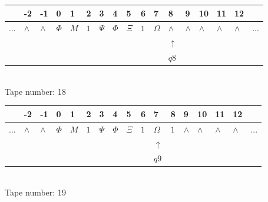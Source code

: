 \documentclass[11pt]{article}
\begin{document}
\begin{table}[H]
\centering
\begin{tabular}{lllllllllllllllll}
 & -2 & -1 & 0 & 1 & 2 & 3 & 4 & 5 & 6 & 7 & 8 & 9 & 10 & 11 & 12 & \\
\hline
$...$ & \multicolumn{1}{|l|}{$\wedge$} & \multicolumn{1}{|l|}{$\wedge$} & \multicolumn{1}{|l|}{$\Phi$} & \multicolumn{1}{|l|}{$M$} & \multicolumn{1}{|l|}{$1$} & \multicolumn{1}{|l|}{$\Psi$} & \multicolumn{1}{|l|}{$\Phi$} & \multicolumn{1}{|l|}{$\Xi$} & \multicolumn{1}{|l|}{$1$} & \multicolumn{1}{|l|}{$\Omega$} & \multicolumn{1}{|l|}{$\wedge$} & \multicolumn{1}{|l|}{$\wedge$} & \multicolumn{1}{|l|}{$\wedge$} & \multicolumn{1}{|l|}{$\wedge$} & \multicolumn{1}{|l|}{$\wedge$} & $...$\\
\hline
&  &  &  &  &  &  &  &  &  &  & $\uparrow$ &  &  &  &  &  \\
&  &  &  &  &  &  &  &  &  &  & $ q8 $ &  &  &  &  &  \\
\end{tabular}
\\
Tape number: 18
\noindent\makebox[\linewidth]{\hdashrule{\textwidth}{1pt}{1pt}}\end{table}

\begin{table}[H]
\centering
\begin{tabular}{lllllllllllllllll}
 & -2 & -1 & 0 & 1 & 2 & 3 & 4 & 5 & 6 & 7 & 8 & 9 & 10 & 11 & 12 & \\
\hline
$...$ & \multicolumn{1}{|l|}{$\wedge$} & \multicolumn{1}{|l|}{$\wedge$} & \multicolumn{1}{|l|}{$\Phi$} & \multicolumn{1}{|l|}{$M$} & \multicolumn{1}{|l|}{$1$} & \multicolumn{1}{|l|}{$\Psi$} & \multicolumn{1}{|l|}{$\Phi$} & \multicolumn{1}{|l|}{$\Xi$} & \multicolumn{1}{|l|}{$1$} & \multicolumn{1}{|l|}{$\Omega$} & \multicolumn{1}{|l|}{$1$} & \multicolumn{1}{|l|}{$\wedge$} & \multicolumn{1}{|l|}{$\wedge$} & \multicolumn{1}{|l|}{$\wedge$} & \multicolumn{1}{|l|}{$\wedge$} & $...$\\
\hline
&  &  &  &  &  &  &  &  &  & $\uparrow$ &  &  &  &  &  &  \\
&  &  &  &  &  &  &  &  &  & $ q9 $ &  &  &  &  &  &  \\
\end{tabular}
\\
Tape number: 19
\noindent\makebox[\linewidth]{\hdashrule{\textwidth}{1pt}{1pt}}\end{table}
\end{document}
